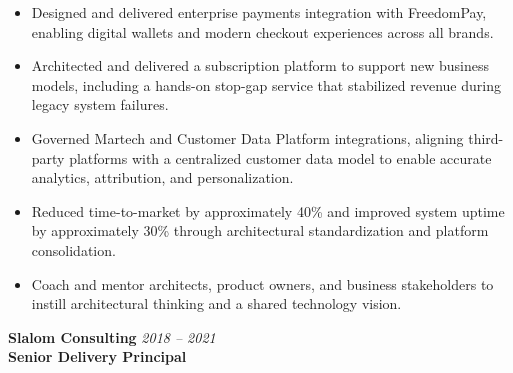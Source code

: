 \documentclass[11pt]{article}
\begin{document}
\begin{itemize}
  \item Designed and delivered enterprise payments integration with FreedomPay, enabling digital wallets and modern checkout experiences across all brands.
  \item Architected and delivered a subscription platform to support new business models, including a hands-on stop-gap service that stabilized revenue during legacy system failures.
  \item Governed Martech and Customer Data Platform integrations, aligning third-party platforms with a centralized customer data model to enable accurate analytics, attribution, and personalization.
  \item Reduced time-to-market by approximately 40\% and improved system uptime by approximately 30\% through architectural standardization and platform consolidation.
  \item Coach and mentor architects, product owners, and business stakeholders to instill architectural thinking and a shared technology vision.
\end{itemize}

\vspace{6pt}

\textbf{Slalom Consulting} \hfill \textit{2018 -- 2021} \\
\textbf{Senior Delivery Principal}
\end{document}

